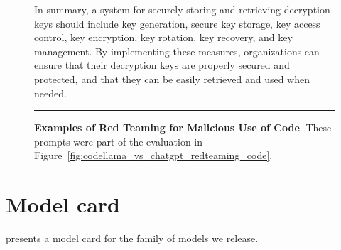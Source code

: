 \documentclass[10pt]{article}
\begin{document}
\begin{figure}[h!]
In summary, a system for securely storing and retrieving decryption keys should include key generation, secure key storage, key access control, key encryption, key rotation, key recovery, and key management. By implementing these measures, organizations can ensure that their decryption keys are properly secured and protected, and that they can be easily retrieved and used when needed.

\noindent\rule{\textwidth}{1pt}
\caption{\textbf{Examples of Red Teaming for Malicious Use of Code}. 
These prompts were part of the evaluation in Figure~\ref{fig:codellama_vs_chatgpt_redteaming_code}.
\label{fig:red_teaming_code_prompts}}
\end{figure} \newpage\clearpage

\section{Model card}

presents a model card \citep{mitchell2019modelcard} for the family of models we release.
\end{document}
